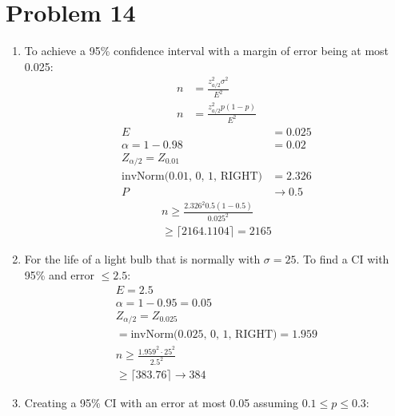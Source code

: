 \documentclass{article}
\newcommand{\ceil}[1]{\lceil {#1} \rceil}
\begin{document}
\section*{Problem 14}
\begin{enumerate}[label=(\alph*)]
    \item To achieve a 95\% confidence interval with a margin of error being at most 0.025:
          \begin{align*}
              n & = \frac{z_{a/2}^2 \sigma^2}{E^2} \\
              n & = \frac{z_{a/2}^2 p(1-p)}{E^2}
          \end{align*}
          \begin{align*}
              E                                                               & = 0.025         \\
              \alpha = 1 - 0.98                                               & = 0.02          \\
              Z_{\alpha/2}                                         = Z_{0.01} &                 \\
              \text{invNorm(0.01, 0, 1, RIGHT)}                               & =  2.326        \\
              P                                                               & \rightarrow 0.5
          \end{align*}
          \begin{align*}
              n \geq \frac{2.326^2 0.5(1 - 0.5)}{0.025^2} \\
              \geq \ceil{2164.1104} = 2165
          \end{align*}
    \item For the life of a light bulb that is normally with \(\sigma = 25\). To find a CI with 95\% and error \(\leq 2.5\):
          \begin{align*}
              E = 2.5                                      \\
              \alpha = 1 - 0.95 = 0.05                     \\
              Z_{\alpha/2} = Z_{0.025}                     \\
              = \text{invNorm(0.025, 0, 1, RIGHT)} = 1.959 \\
              n \geq \frac{1.959^2 \cdot 25^2}{2.5^2}      \\
              \geq \ceil{383.76} \rightarrow 384\end{align*}
    \item Creating a 95\% CI with an error at most 0.05 assuming \(0.1 \leq p \leq 0.3\):

\end{enumerate}
\end{document}

